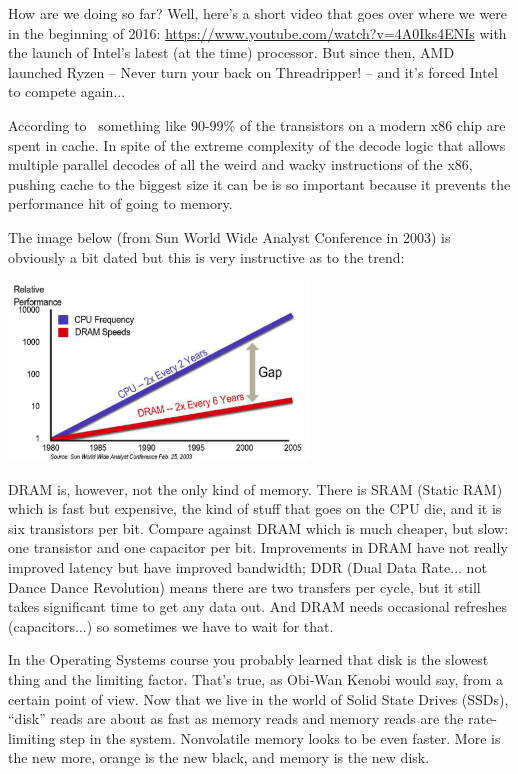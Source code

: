 \documentclass[a4paper]{report}
\begin{document}
How are we doing so far? Well, here's a short video that goes over where we were in the beginning of 2016: \url{https://www.youtube.com/watch?v=4A0Iks4ENIs} with the launch of Intel's latest (at the time) processor. But since then, AMD launched Ryzen -- Never turn your back on Threadripper! -- and it's forced Intel to compete again... 

According to~\cite{modern-hardware} something like 90-99\% of the transistors on a modern x86 chip are spent in cache. In spite of the extreme complexity of the decode logic that allows multiple parallel decodes of all the weird and wacky instructions of the x86, pushing cache to the biggest size it can be is so important because it prevents the performance hit of going to memory.

The image below (from Sun World Wide Analyst Conference in 2003) is obviously a bit dated but this is very instructive as to the trend:
\begin{center}
\includegraphics[width=0.6\textwidth]{images/ram-vs-cpu.png}
\end{center}

DRAM is, however, not the only kind of memory. There is SRAM (Static RAM) which is fast but expensive, the kind of stuff that goes on the CPU die, and it is six transistors per bit. Compare against DRAM which is much cheaper, but slow: one transistor and one capacitor per bit. Improvements in DRAM have not really improved latency but have improved bandwidth; DDR (Dual Data Rate... not Dance Dance Revolution) means there are two transfers per cycle, but it still takes significant time to get any data out. And DRAM needs occasional refreshes (capacitors...) so sometimes we have to wait for that.

In the Operating Systems course you probably learned that disk is the slowest thing and the limiting factor. That's true, as Obi-Wan Kenobi would say, from a certain point of view. Now that we live in the world of Solid State Drives (SSDs), ``disk'' reads are about as fast as memory reads and memory reads are the rate-limiting step in the system. Nonvolatile memory looks to be even faster. More is the new more, orange is the new black, and memory is the new disk.
\end{document}
